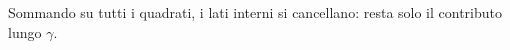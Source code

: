 \documentclass[preview]{standalone}
\begin{document}
\begin{center}
Sommando su tutti i quadrati, i lati interni si cancellano: resta solo il contributo lungo $\gamma$.
\end{center}
\end{document}
